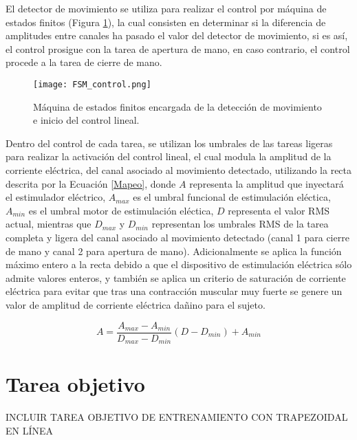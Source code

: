 El detector de movimiento se utiliza para realizar el control por máquina de estados finitos (Figura \ref{Figura: FSM_control}), la cual consisten en determinar si la diferencia de amplitudes entre canales ha pasado el valor del detector de movimiento, si es así, el control prosigue con la tarea de apertura de mano, en caso contrario, el control procede a la tarea de cierre de mano.

\begin{figure}[htbp]
	\centering
	\texttt{[image: FSM\_control.png]}
	\caption{Máquina de estados finitos encargada de la detección de movimiento e inicio del control lineal.}
	\label{Figura: FSM_control}
\end{figure}

Dentro del control de cada tarea, se utilizan los umbrales de las tareas ligeras para realizar la activación del control lineal, el cual modula la amplitud de la corriente eléctrica, del canal asociado al movimiento detectado, utilizando la recta descrita por la Ecuación \ref{Mapeo}, donde $A$ representa la amplitud que inyectará el estimulador eléctrico, $A_{max}$ es el umbral funcional de estimulación eléctica, $A_{min}$ es el umbral motor de estimulación eléctica, $D$ representa el valor RMS actual, mientras que $D_{max}$ y $D_{min}$ representan los umbrales RMS de la tarea completa y ligera del canal asociado al movimiento detectado (canal 1 para cierre de mano y canal 2 para apertura de mano). Adicionalmente se aplica la función máximo entero a la recta debido a que el dispositivo de estimulación eléctrica sólo admite valores enteros, y también se aplica un criterio de saturación de corriente eléctrica para evitar que tras una contracción muscular muy fuerte se genere un valor de amplitud de corriente eléctrica dañino para el sujeto.

\begin{equation}
	A = \frac{A_{max} - A_{min}}{D_{max} - D_{min}}(D - D_{min}) + A_{min}
	\label{Mapeo}
\end{equation}

\section{Tarea objetivo}
{\color{red}INCLUIR TAREA OBJETIVO DE ENTRENAMIENTO CON TRAPEZOIDAL EN LÍNEA}
